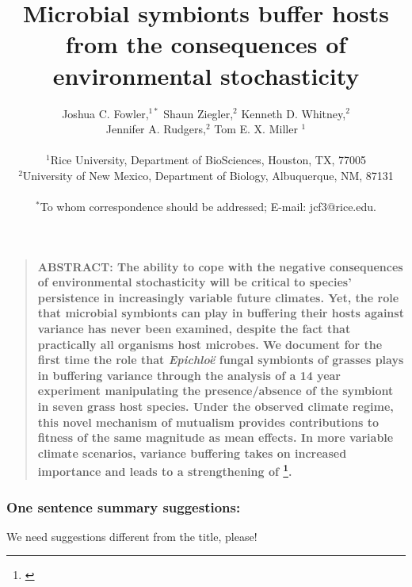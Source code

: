 \documentclass[12pt]{article}
\title{Microbial symbionts buffer hosts from the consequences of environmental stochasticity}
\author
{Joshua C. Fowler,$^{1\ast}$ Shaun Ziegler,$^{2}$ Kenneth D. Whitney,$^{2}$\\
	 Jennifer A. Rudgers,$^{2}$ Tom E. X. Miller $^{1}$\\
\\
\normalsize{$^{1}$Rice University, Department of BioSciences, Houston, TX, 77005}\\
\normalsize{$^{2}$University of New Mexico, Department of Biology, Albuquerque, NM, 87131}\\
\\
\normalsize{$^\ast$To whom correspondence should be addressed; E-mail:  jcf3@rice.edu.}
}
\date{}
\newcommand{\josh}[2]{{\color{blue}{#1}}\footnote{\textit{\color{blue}{#2}}}}
\newenvironment{sciabstract}{%
\begin{quote} \bf}
{\end{quote}}
\begin{document}
 


\baselineskip24pt


\maketitle 



\begin{sciabstract}
	ABSTRACT: 
    The ability to cope with the negative consequences of environmental stochasticity will be critical to species' persistence in increasingly variable future climates. 
	Yet, the role that microbial symbionts can play in buffering their hosts against variance has never been examined, despite the fact that practically all organisms host microbes. 
	We document for the first time the role that \emph{Epichlo\"{e}} fungal symbionts of grasses plays in buffering variance through the analysis of a 14 year experiment manipulating the presence/absence of the symbiont in seven grass host species.
	Under the observed climate regime, this novel mechanism of mutualism provides contributions to fitness of the same magnitude as mean effects.
	In more variable climate scenarios, variance buffering takes on increased importance and leads to a strengthening of \josh{mutualism}{The abstract is limited to 125 words.}. 

\end{sciabstract}


\subsubsection*{One sentence summary suggestions:}
We need suggestions different from the title, please!

\end{document}
